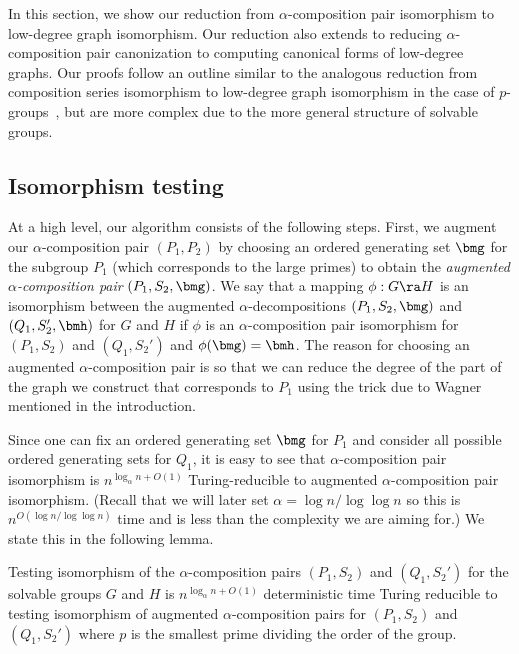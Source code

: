 In this section, we show our reduction from $\alpha$-composition pair isomorphism to low-degree graph isomorphism.  Our reduction also extends to reducing $\alpha$-composition pair canonization to computing canonical forms of low-degree graphs.  Our proofs follow an outline similar to the analogous reduction from composition series isomorphism to low-degree graph isomorphism in the case of $p$-groups~\cite{rosenbaum2013c}, but are more complex due to the more general structure of solvable groups.

\subsection{Isomorphism testing}
At a high level, our algorithm consists of the following steps.  First, we augment our $\alpha$-composition pair $(P_1, P_2)$ by choosing an ordered generating set $\bmg$ for the subgroup $P_1$ (which corresponds to the large primes) to obtain the \emph{augmented $\alpha$-composition pair} $(P_1, S_2, \bmg)$.  We say that a mapping $\phi : G \ra H$ is an isomorphism between the augmented $\alpha$-decompositions $(P_1, S_2, \bmg)$ and $(Q_1, S_2', \bmh)$ for $G$ and $H$ if $\phi$ is an $\alpha$-composition pair isomorphism for $(P_1, S_2)$ and $(Q_1, S_2')$ and $\phi(\bmg) = \bmh$.  The reason for choosing an augmented $\alpha$-composition pair is so that we can reduce the degree of the part of the graph we construct that corresponds to $P_1$ using the trick due to Wagner~\cite{wagner2011a} mentioned in the introduction.

Since one can fix an ordered generating set $\bmg$ for $P_1$ and consider all possible ordered generating sets for $Q_1$, it is easy to see that $\alpha$-composition pair isomorphism is $n^{\log_{\alpha} n + O(1)}$ Turing-reducible to augmented $\alpha$-composition pair isomorphism.  (Recall that we will later set $\alpha = \log n / \log \log n$ so this is $n^{O(\log n / \log \log n)}$ time and is less than the complexity we are aiming for.)  We state this in the following lemma.

\begin{lemma}
  \label{lem:alpha-comp-red}
  Testing isomorphism of the $\alpha$-composition pairs $(P_1, S_2)$ and $(Q_1, S_2')$ for the solvable groups $G$ and $H$ is $n^{\log_{\alpha} n + O(1)}$ deterministic time Turing reducible to testing isomorphism of augmented $\alpha$-composition pairs for $(P_1, S_2)$ and $(Q_1, S_2')$ where $p$ is the smallest prime dividing the order of the group.
\end{lemma}

